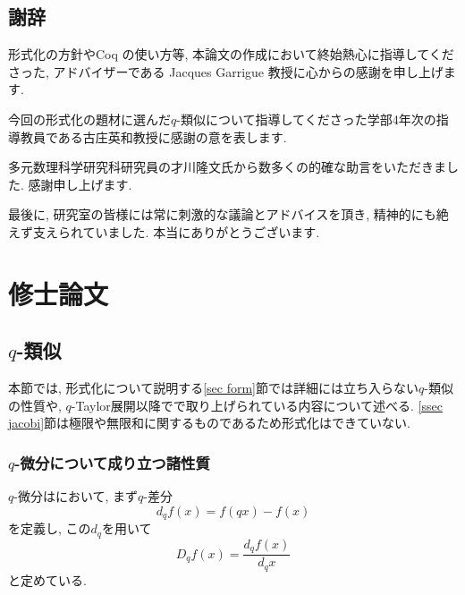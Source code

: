 \documentclass[11pt]{jsreport}
\theoremstyle{mystyle}
\newcommand{\0}{\textbf{0}}
\newcommand{\1}{\textbf{1}}
\newcommand{\2}{\textbf{2}}
\begin{document}
\section*{謝辞}
形式化の方針やCoq の使い方等, 本論文の作成において終始熱心に指導してくださった, アドバイザーである Jacques Garrigue 教授に心からの感謝を申し上げます. 

今回の形式化の題材に選んだ$q$-類似について指導してくださった学部4年次の指導教員である古庄英和教授に感謝の意を表します. 

多元数理科学研究科研究員の才川隆文氏から数多くの的確な助言をいただきました. 感謝申し上げます. 

最後に, 研究室の皆様には常に刺激的な議論とアドバイスを頂き, 精神的にも絶えず支えられていました. 本当にありがとうございます. 
\chapter{修士論文} \label{chap thesis}
\section{$q$-類似} \label{sec qana}
本節では, 形式化について説明する\ref{sec form}節では詳細には立ち入らない$q$-類似の性質や, $q$-Taylor展開以降で\cite{Kac}で取り上げられている内容について述べる. 
\ref{ssec jacobi}節は極限や無限和に関するものであるため形式化はできていない. 
\subsection{$q$-微分について成り立つ諸性質} \label{ssec qprops}
$q$-微分は\cite{Kac}において, まず$q$-差分
\[
  d_q f(x) = f(qx) - f(x)
\]
を定義し, この$d_q$を用いて
\[
  D_q f(x) = \frac{d_q f(x)}{d_q x}
\]
と定めている. 
\end{document}
